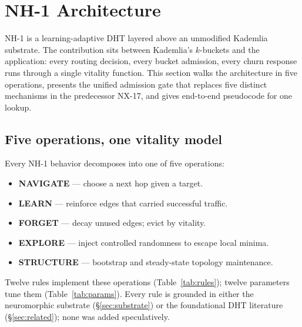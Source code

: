 \documentclass[conference]{IEEEtran}
\newcommand{\nhone}{NH-1\xspace}
\newcommand{\NXseventeen}{NX-17\xspace}
\begin{document}
\section{\nhone Architecture}
\label{sec:nh1}

\nhone is a learning-adaptive DHT layered above an unmodified Kademlia
substrate. The contribution sits between Kademlia's $k$-buckets and the
application: every routing decision, every bucket admission, every churn
response runs through a single vitality function. This section walks the
architecture in five operations, presents the unified admission gate that
replaces five distinct mechanisms in the predecessor \NXseventeen, and
gives end-to-end pseudocode for one lookup.

\subsection{Five operations, one vitality model}
\label{sec:nh1-overview}

Every \nhone behavior decomposes into one of five operations:

\begin{itemize}
\item \textbf{NAVIGATE} --- choose a next hop given a target.
\item \textbf{LEARN} --- reinforce edges that carried successful traffic.
\item \textbf{FORGET} --- decay unused edges; evict by vitality.
\item \textbf{EXPLORE} --- inject controlled randomness to escape local minima.
\item \textbf{STRUCTURE} --- bootstrap and steady-state topology maintenance.
\end{itemize}

\noindent
Twelve rules implement these operations (Table~\ref{tab:rules}); twelve
parameters tune them (Table~\ref{tab:params}). Every rule is grounded in
either the neuromorphic substrate (\S\ref{sec:substrate}) or the foundational
DHT literature (\S\ref{sec:related}); none was added speculatively.
\end{document}
